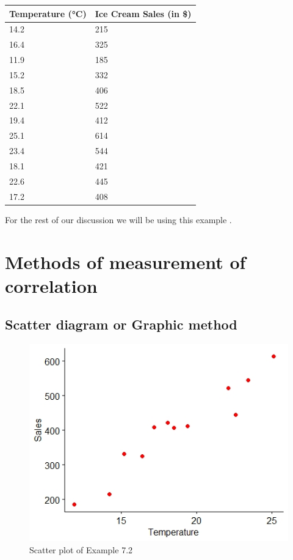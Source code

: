 \documentclass[
]{book}
\begin{document}
\begin{longtable}[]{@{}ll@{}}
\toprule
Temperature (°C) & Ice Cream Sales (in \$) \\
\midrule
\endhead
14.2 & 215 \\
16.4 & 325 \\
11.9 & 185 \\
15.2 & 332 \\
18.5 & 406 \\
22.1 & 522 \\
19.4 & 412 \\
25.1 & 614 \\
23.4 & 544 \\
18.1 & 421 \\
22.6 & 445 \\
17.2 & 408 \\
\bottomrule
\end{longtable}

For the rest of our discussion we will be using this example .

\hypertarget{methods-of-measurement-of-correlation}{%
\section{Methods of measurement of correlation}\label{methods-of-measurement-of-correlation}}

\hypertarget{scatter-diagram-or-graphic-method}{%
\subsection{Scatter diagram or Graphic method}\label{scatter-diagram-or-graphic-method}}

\begin{figure}

{\centering \includegraphics[width=0.5\linewidth]{images/image3c} 

}

\caption{Scatter plot of Example 7.2}\label{fig:c2}
\end{figure}
\end{document}
